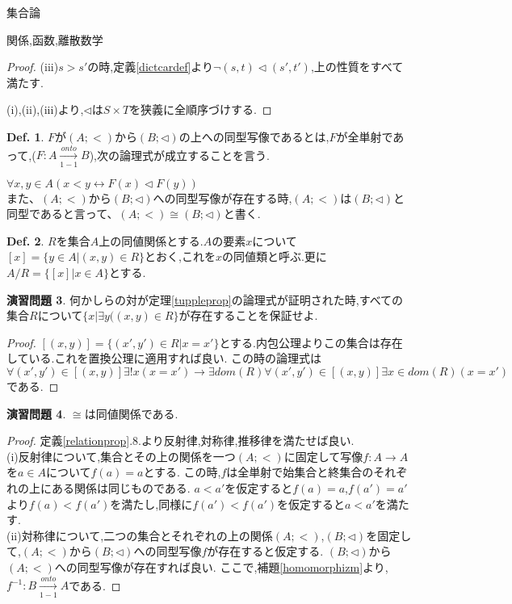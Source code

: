 \documentclass[14pt]{jsarticle}
\theoremstyle{definition}
\newtheorem{dfn}{Def.}[subsection]
\newtheorem{doril}[dfn]{演習問題}
\begin{document}
\begin{section}{集合論}
\begin{subsection}{関係,函数,離散数学}
\begin{proof}
(iii)$s>s'$の時,定義\ref{dictcardef}より$\lnot (s,t) \triangleleft (s',t')$,上の性質をすべて満たす.\par
(i),(ii),(iii)より,$\triangleleft$は$S \times T$を狭義に全順序づけする.
\end{proof}
\begin{dfn}
\label{congdef}
$F$が$(A;<)$から$(B;\triangleleft)$の上への同型写像であるとは,$F$が全単射であって,($F:A\xrightarrow[1-1]{onto}B$),次の論理式が成立することを言う.\par
$\forall x,y\in A(x<y \leftrightarrow F(x) \triangleleft F(y))$\\
また、$(A;<)$から$(B;\triangleleft)$への同型写像が存在する時,$(A;<)$は$(B;\triangleleft)$と同型であると言って、$(A;<)\cong(B;\triangleleft)$と書く.
\end{dfn}
\begin{dfn}
\label{equivalentdef}
$R$を集合$A$上の同値関係とする.$A$の要素$x$について$[x]=\{y\in A|(x,y)\in R\}$とおく,これを$x$の同値類と呼ぶ.更に$A/R=\{[x]|x\in A\}$とする.
\end{dfn}
\begin{doril}
\label{tuppleexist}
何かしらの対が定理\ref{tuppleprop}の論理式が証明された時,すべての集合$R$について$\{x|\exists y((x,y)\in R\}$が存在することを保証せよ.
\end{doril}
\begin{proof}
$[(x,y)]=\{(x',y')\in R|x=x'\}$とする.内包公理よりこの集合は存在している.これを置換公理に適用すれば良い.
この時の論理式は$\forall (x',y') \in [(x,y)] \exists !x(x=x') \to \exists dom(R) \forall (x',y') \in [(x,y)] \exists x \in dom(R)(x=x')$である.
\end{proof}
\begin{doril}
\label{congequ}
$\cong$は同値関係である.
\end{doril}
\begin{proof}
定義\ref{relationprop}.8.より反射律,対称律,推移律を満たせば良い.\\
(i)反射律について,集合とその上の関係を一つ$(A;<)$に固定して写像$f:A\to A$を$a\in A$について$f(a)=a$とする.
この時,$f$は全単射で始集合と終集合のそれぞれの上にある関係は同じものである.
$a<a'$を仮定すると$f(a)=a$,$f(a')=a'$より$f(a)<f(a')$を満たし,同様に$f(a')<f(a')$を仮定すると$a<a'$を満たす.\\
(ii)対称律について,二つの集合とそれぞれの上の関係$(A;<)$,$(B;\triangleleft)$を固定して,$(A;<)$から$(B;\triangleleft)$への同型写像$f$が存在すると仮定する.
$(B;\triangleleft)$から$(A;<)$への同型写像が存在すれば良い.
ここで,補題\ref{homomorphizm}より,$f^{-1}:B\xrightarrow[1-1]{onto}A$である.\par

\end{proof}
\end{subsection}
\end{section}
\end{document}
